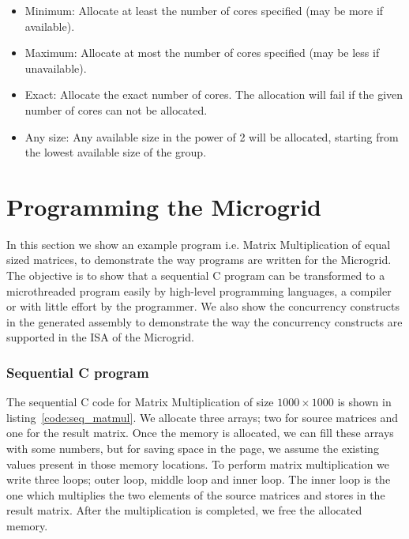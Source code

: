 \documentclass{article}
\begin{document}
\begin{itemize}

\item Minimum: Allocate at least the number of cores specified (may be more if
    available).

\item Maximum: Allocate at most the number of cores specified (may be less if
    unavailable).

\item Exact: Allocate the exact number of cores. The allocation will fail if
    the given number of cores can not be allocated.

\item Any size: Any available size in the power of 2 will be allocated,
    starting from the lowest available size of the group.

\end{itemize}

\section{Programming the Microgrid}\label{sn:program_microgrids}

In this section we show an example program i.e. Matrix Multiplication of equal
sized matrices, to demonstrate the way programs are written for the Microgrid.
The objective is to show that a sequential C program can be transformed to a
microthreaded program easily by high-level programming languages, a compiler or
with little effort by the programmer. We also show the concurrency constructs
in the generated assembly to demonstrate the way the concurrency constructs are
supported in the ISA of the Microgrid.

\subsubsection*{Sequential C program}

The sequential C code for Matrix Multiplication of size $1000 \times 1000$ is
shown in listing~\ref{code:seq_matmul}. We allocate three arrays; two for
source matrices and one for the result matrix. Once the memory is allocated, we
can fill these arrays with some numbers, but for saving space in the page, we
assume the existing values present in those memory locations. To perform matrix
multiplication we write three loops; outer loop, middle loop and inner loop.
The inner loop is the one which multiplies the two elements of the source
matrices and stores in the result matrix. After the multiplication is
completed, we free the allocated memory.
\end{document}
